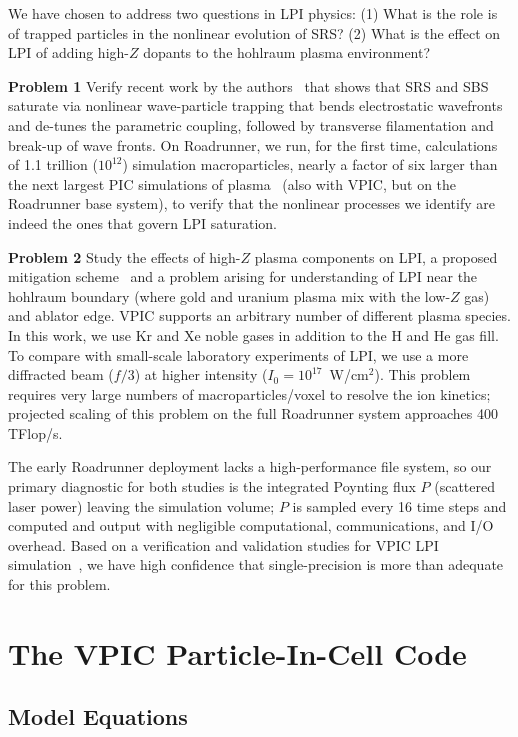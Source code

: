 \documentclass[10pt]{article}
\begin{document}
We have chosen to address two questions in LPI physics: (1) What is 
the role is of trapped particles in the nonlinear evolution of SRS?  
(2) What is the effect on LPI of adding high-$Z$ dopants to the 
hohlraum plasma environment?

\textbf{Problem 1}
Verify recent work by the authors~\cite{} that shows that SRS and
SBS saturate via nonlinear wave-particle trapping that bends
electrostatic wavefronts and de-tunes the parametric coupling,
followed by transverse filamentation and break-up of wave fronts.  On
Roadrunner, we run, for the first time, calculations of 1.1 trillion
($10^{12}$) simulation macroparticles, nearly a factor of six larger
than the next largest PIC simulations of plasma~\cite{} (also with
VPIC, but on the Roadrunner base system), to verify that the nonlinear 
processes we identify are indeed the ones that govern LPI saturation.

\textbf{Problem 2}
Study the effects of high-$Z$ plasma components on LPI, a proposed mitigation 
scheme~\cite{} and a problem arising
for understanding of LPI near the hohlraum boundary (where gold and
uranium plasma mix with the low-$Z$ gas) and ablator edge.  VPIC
supports an arbitrary number of different plasma species.  In this 
work, we use Kr and Xe noble gases in addition to the H
and He gas fill.  To compare with small-scale laboratory experiments
of LPI, we use a more diffracted beam ($f/3$) at higher intensity
($I_0 = 10^{17}$~W/cm$^2$). This problem requires very large numbers
of macroparticles/voxel to resolve the ion kinetics; projected scaling
of this problem on the full Roadrunner system approaches 400 TFlop/s.

The early Roadrunner deployment lacks a high-performance file system,
so our primary diagnostic for both studies is the integrated Poynting
flux $P$ (scattered laser power) leaving the simulation volume; $P$ is
sampled every 16 time steps and computed and output with
negligible computational, communications, and I/O overhead.  Based on a
verification and validation studies for VPIC LPI simulation~\cite{}, 
we have high confidence that single-precision is more than adequate 
for this problem.


\section{The VPIC Particle-In-Cell Code}

\subsection{Model Equations}
\end{document}
